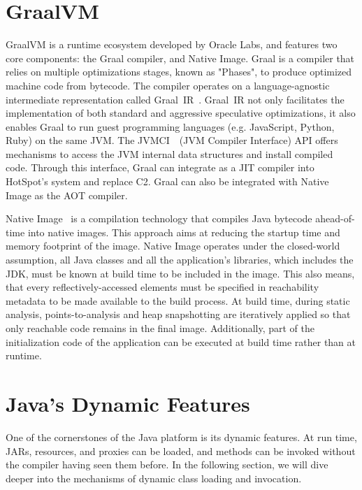 \section{GraalVM}
GraalVM is a runtime ecosystem developed by Oracle Labs, and features two core components: the Graal compiler, and Native Image. 
Graal is a compiler that relies on multiple optimizations  stages, known as "Phases", to produce optimized machine code from bytecode. The compiler operates on a language-agnostic intermediate representation called Graal~IR~\cite{duboscq_graal_nodate}. Graal~IR not only facilitates the implementation of both standard and aggressive speculative optimizations, it also enables Graal to run guest programming languages (e.g. JavaScript, Python, Ruby) on the same JVM. 
The JVMCI~\cite{noauthor_jep_nodate}~(JVM Compiler Interface) API offers mechanisms to access the JVM internal data structures and install compiled code. Through this interface, Graal can integrate as a JIT compiler into HotSpot's system and replace C2. 
Graal can also be integrated with Native Image as the AOT compiler.

Native Image~\cite{wimmer_initialize_2019} is a compilation technology that compiles Java bytecode ahead-of-time into native images. This approach aims at reducing the startup time and memory footprint of the image. Native Image operates under the closed-world assumption, all Java classes and all the application's libraries, which includes the JDK, must be known at build time to be included in the image.
This also means, that every reflectively-accessed elements must be specified in reachability metadata to be made available to the build process. 
At build time, during static analysis, points-to-analysis and heap snapshotting are iteratively applied so that only reachable code remains in the final image. Additionally, part of the initialization code of the application can be executed at build time rather than at runtime.


\section{Java's Dynamic Features}
One of the cornerstones of the Java platform is its dynamic features. At run time, JARs, resources, and proxies can be loaded, and methods can be invoked without the compiler having seen them before. In the following section, we will dive deeper into the mechanisms of dynamic class loading and invocation.

